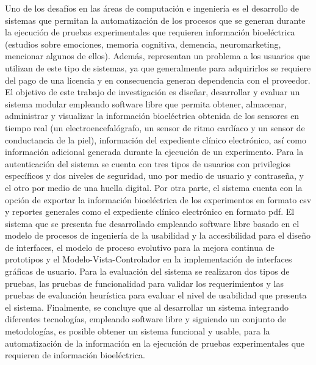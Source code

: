 
\begin{resumen}
Uno de los desafíos en las áreas de computación e ingeniería es el desarrollo de sistemas que permitan la automatización de los procesos que se generan durante la ejecución de pruebas experimentales que requieren información bioeléctrica (estudios sobre emociones, memoria cognitiva, demencia, neuromarketing, mencionar algunos de ellos). Además, representan un problema a los usuarios que utilizan de este tipo de sistemas, ya que generalmente para adquirirlos se requiere del pago de una licencia y en consecuencia generan dependencia con el proveedor. El objetivo de este trabajo de investigación es diseñar, desarrollar y evaluar un sistema modular empleando software libre que permita obtener, almacenar, administrar y visualizar la información bioeléctrica obtenida de los sensores en tiempo real (un electroencefalógrafo, un sensor de ritmo cardíaco y un sensor de conductancia de la piel), información del expediente clínico electrónico, así como información adicional generada durante la ejecución de un experimento. Para la autenticación del sistema se cuenta con tres tipos de usuarios con privilegios específicos y dos niveles de seguridad, uno por medio de usuario y contraseña, y el otro por medio de una huella digital. Por otra parte, el sistema cuenta con la opción de exportar la información bioeléctrica de los experimentos en formato csv y reportes generales como el expediente clínico electrónico en formato pdf. El sistema que se presenta fue desarrollado empleando software libre basado en el modelo de procesos de ingeniería de la usabilidad y la accesibilidad para el diseño de interfaces, el modelo de proceso evolutivo para la mejora continua de prototipos y el Modelo-Vista-Controlador en la implementación de interfaces gráficas de usuario. Para la evaluación del sistema se realizaron dos tipos de pruebas, las pruebas de funcionalidad para validar los requerimientos y las pruebas de evaluación heurística para evaluar el nivel de usabilidad que presenta el sistema. Finalmente, se concluye que al desarrollar un sistema integrando diferentes tecnologías, empleando software libre y siguiendo un conjunto de metodologías, es posible obtener un sistema funcional y usable, para la automatización de la información en la ejecución de pruebas experimentales que requieren de información bioeléctrica.

\end{resumen}
